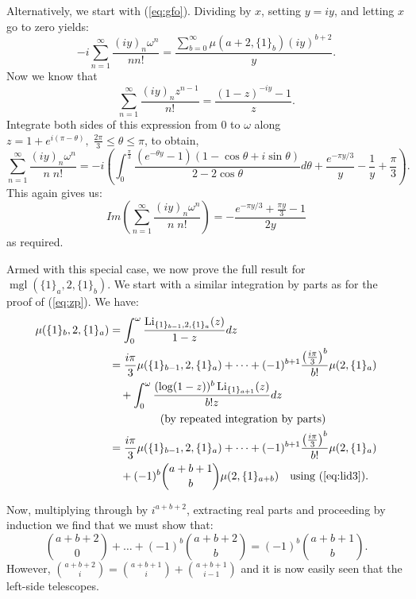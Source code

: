 \documentclass[a4paper,a4paper]{article}
\newcommand{\mgl}{\operatorname{mgl}}
\newcommand{\li}{\operatorname{Li}}
\newcommand{\eop}{\vrule height .9ex width .9ex depth -.1ex}
\begin{document}
\medskip

 Alternatively, we start with (\ref{eq:gfo}).
  Dividing by $x$, setting $ y = iy $, and letting $x$ go to zero
  yields:
$$
-i \sum_{n=1}^\infty \frac{(iy)_n \omega^n}{n n!}
=\frac{ \sum_{b = 0}^\infty \mu(a+2, \{ 1 \}_b) (iy)^{b+2}}{y}.
$$
Now we know that
$$
\sum_{n=1}^\infty \frac{(iy)_n z^{n-1}}{n!} = \frac{(1-z)^{-iy}
-1}{z}.
$$
Integrate both sides of this expression from
 $ 0 $ to $ \omega $
 along $ z = 1 + e^{i(\pi - \theta)}, \; \frac{2\pi}{3} \le \theta \le \pi
 $, to obtain,
$$
\sum_{n=1}^\infty \frac{(iy)_n \omega^n}{n \; n!} =
-i \left( \int_0^{\frac{\pi}{3}} \frac{(e^{-\theta y}- 1)(1 - \cos \theta +
 i \sin \theta)}{2 - 2 \cos \theta} d\theta + \frac{e^{-\pi y/3}}{y}
  - \frac{1}{y} + \frac{\pi}{3} \right).
$$
This again gives us:
$$
Im \left( \sum_{n=1}^\infty \frac{(iy)_n \omega^n}{n \; n!} \right)
= - \frac{e^{-\pi y /3} + \frac{\pi y}{3} - 1}{2y}
$$
as required.

\medskip

Armed with this special case, we now prove the full result
for $ \mgl(\{ 1 \}_a, 2, \{ 1 \}_b) $.
 We
start with a similar integration by parts as for the proof of (\ref{eq:zp}).
We have:
\begin{equation*}
\begin{split}
\mu(\{ 1 \}_b, 2, \{ 1 \}_a) &= \int_0^\omega \frac{\li_{ \{ 1 \}_{b-1}, 2,
\{ 1 \}_a} (z)}{1-z} dz \\
&= \frac{i \pi}{3} \mu(\{ 1 \}_{b-1}, 2, \{ 1 \}_a) + \dots + (-1)^{b+1}
\frac{\left( \frac{i \pi}{3} \right)^b}{b!}\mu(2,\{ 1 \}_a) \\
&\quad + \int_0^\omega \frac{ (\log (1-z))^b \li_{ \{ 1 \}_{a+1}}(z)}{b! z} dz \\
 &\quad \hspace{.5in}\text{(by repeated integration by parts)} \\
&= \frac{i \pi}{3} \mu(\{ 1 \}_{b-1}, 2, \{ 1 \}_a) + \dots + (-1)^{b+1}
\frac{\left( \frac{i \pi}{3} \right)^b}{b!}\mu(2,\{ 1 \}_a) \\
&\quad+ (-1)^b {a+b + 1 \choose b} \mu(2, \{ 1 \}_{a+b})
\quad \text{using (\ref{eq:lid3})}.
\end{split}
\end{equation*}

Now, multiplying through by $ i^{a+b+2} $, extracting real parts
 and proceeding by induction we find that we must show that:
$$
{a + b + 2 \choose 0} + \dots + (-1)^b { a+b+2 \choose b }
 = (-1)^b {a + b + 1 \choose
b}.
$$
However, $ {a + b + 2 \choose i} = {a + b + 1 \choose i} + {a + b + 1
\choose i-1} $
and it is now easily seen that the left-side telescopes.
\eop
\end{document}
